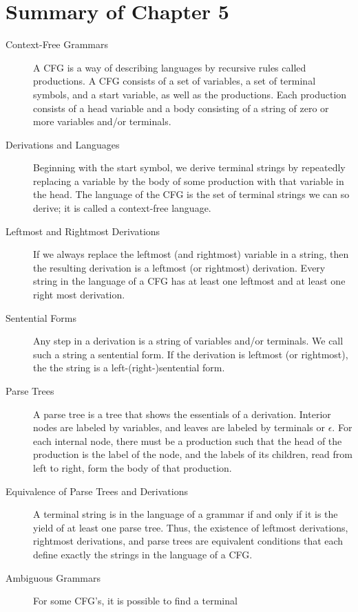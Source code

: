 \documentclass[]{article}
\begin{document}
\section*{Summary of Chapter 5}
  \begin{description}
    \item[Context-Free Grammars] A CFG is a way of describing languages by
    recursive rules called productions. A CFG consists of a set of variables, a
    set of terminal symbols, and a start variable, as well as the productions.
    Each production consists of a head variable and a body consisting of a
    string of zero or more variables and/or terminals.
    \item[Derivations and Languages] Beginning with the start symbol, we derive
    terminal strings by repeatedly replacing a variable by the body of some
    production with that variable in the head. The language of the CFG is the
    set of terminal strings we can so derive; it is called a context-free
    language.
    \item[Leftmost and Rightmost Derivations] If we always replace the leftmost
    (and rightmost) variable in a string, then the resulting derivation is a
    leftmost (or rightmost) derivation. Every string in the language of a CFG
    has at least one leftmost and at least one right most derivation.
    \item[Sentential Forms] Any step in a derivation is a string of variables
    and/or terminals. We call such a string a sentential form. If the derivation
    is leftmost (or rightmost), the the string is a left-(right-)sentential
    form.
    \item[Parse Trees] A parse tree is a tree that shows the essentials of a
    derivation. Interior nodes are labeled by variables, and leaves are labeled
    by terminals or $\epsilon$. For each internal node, there must be a
    production such that the head of the production is the label of the node,
    and the labels of its children, read from left to right, form the body of
    that production.
    \item[Equivalence of Parse Trees and Derivations] A terminal string is in
    the language of a grammar if and only if it is the yield of at least one
    parse tree. Thus, the existence of leftmost derivations, rightmost
    derivations, and parse trees are equivalent conditions that each define
    exactly the strings in the language of a CFG.
    \item[Ambiguous Grammars] For some CFG's, it is possible to find a terminal

\end{description}
\end{document}
